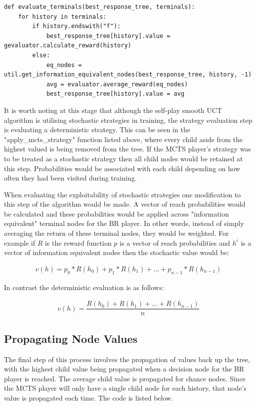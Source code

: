 \begin{lstlisting}[style=Python]
def evaluate_terminals(best_response_tree, terminals):
    for history in terminals:
        if history.endswith("f"):
            best_response_tree[history].value = gevaluator.calculate_reward(history)
        else:
            eq_nodes = util.get_information_equivalent_nodes(best_response_tree, history, -1)
            avg = evaluator.average_reward(eq_nodes)
            best_response_tree[history].value = avg
\end{lstlisting}

It is worth noting at this stage that although the self-play smooth UCT algorithm is utilising
stochastic strategies in training, the strategy evaluation step is evaluating a deterministic strategy.
This can be seen in the "apply\_mcts\_strategy" function listed above, where every
child aside from the highest valued is being removed from the tree.
If the MCTS player's strategy was to be treated as a stochastic strategy then all child
nodes would be retained at this step.
Probabilities would be associated with each child depending on how often they had been visited during training.

When evaluating the exploitability of stochastic strategies one
modification to this step of the algorithm would be made.
A vector of reach probabilities\citep{johanson2011accelerating} would be calculated and these probabilities would
be applied across "information equivalent" terminal nodes for the BR player.
In other words, instead of simply averaging the return of these terminal nodes, they would be weighted.
For example if $R$ is the reward function $p$ is a vector of reach probabilities and
$h^i$ is a vector of information equivalent nodes then the stochastic value would be:

\begin{align}
    v(h) = p_0*R(h_0) + p_1*R(h_1) + \dots + p_{n-1}*R(h_{n-1})
\end{align}

In contrast the deterministic evaluation is as follows:

\begin{align}
    v(h) = \dfrac{R(h_0) + R(h_1) + \dots + R(h_{n-1})}{n}
\end{align}

\subsection{Propagating Node Values}\label{subsec:propagateTerminals}
The final step of this process involves the propagation of values back up the tree, with the highest
child value being propagated when a decision node for the BR player is reached.
The average child value is propagated for chance nodes.
Since the MCTS player will only have a single child node for each history, that node's value is
propagated each time.
The code is listed below.


